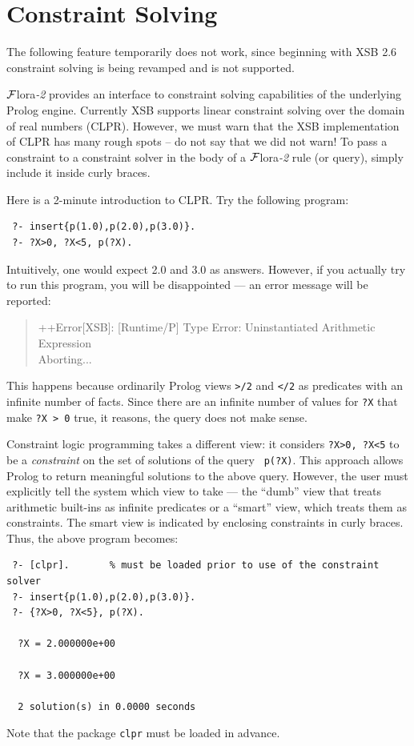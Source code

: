 \documentclass[11pt]{article}
\newcommand{\FLORA}{{\mbox{\sc ${\cal F}${lora}\rm\emph{-2}}}\xspace}
\begin{document}
\section{Constraint Solving}\label{sec-clp}

The following feature temporarily does not work, since beginning with
XSB 2.6 constraint solving is being revamped and is not supported.

\FLORA provides an interface to constraint solving capabilities of the
underlying Prolog engine. Currently XSB supports linear constraint solving
over the domain of real numbers (CLPR). However, we must warn that the XSB
implementation of CLPR has many rough spots -- do not say that we did not
warn! To pass a constraint to a constraint solver in the body of a \FLORA
rule (or query), simply include it inside curly braces.

Here is a 2-minute introduction to CLPR. Try the following program:
\begin{verbatim}
 ?- insert{p(1.0),p(2.0),p(3.0)}.
 ?- ?X>0, ?X<5, p(?X).
\end{verbatim}
Intuitively, one would expect 2.0 and 3.0 as answers. However, if you
actually try to run this
program, you will be disappointed --- an error message will be
reported:
\begin{quote}
 ++Error[XSB]: [Runtime/P] Type Error: Uninstantiated Arithmetic Expression \\
 Aborting...
\end{quote}
This happens because ordinarily Prolog views {\tt >/2} and {\tt </2} as
predicates with an infinite number of facts. Since there are an infinite number
of values for {\tt ?X} that make {\tt ?X > 0} true, it reasons, the query
does not make sense.

Constraint logic programming takes a different view: it considers {\tt ?X>0,
  ?X<5} to be a \emph{constraint} on the set of solutions of the query {\tt
  p(?X)}. This approach allows Prolog to return meaningful solutions to the
above query. However, the user must explicitly tell the system which view
  to take --- the ``dumb'' view that treats arithmetic built-ins as
  infinite predicates or a ``smart'' view, which treats them as constraints.
  The smart view is indicated by enclosing constraints in curly
  braces. Thus, the above program becomes:
\begin{verbatim}
 ?- [clpr].       % must be loaded prior to use of the constraint solver
 ?- insert{p(1.0),p(2.0),p(3.0)}.
 ?- {?X>0, ?X<5}, p(?X).
  
  ?X = 2.000000e+00

  ?X = 3.000000e+00

  2 solution(s) in 0.0000 seconds
\end{verbatim}
Note that the package {\tt clpr} must be loaded in advance.
\end{document}
